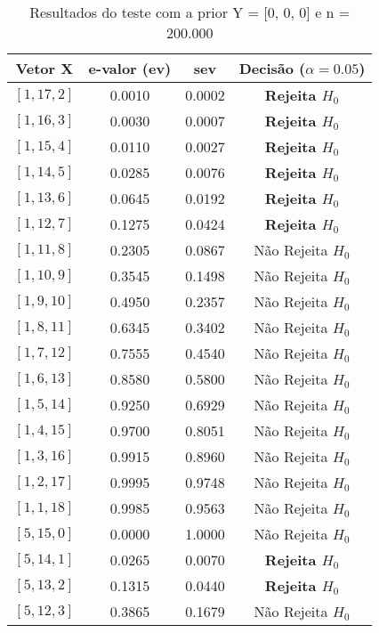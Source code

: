 \documentclass[12pt, a4paper]{article}
\begin{document}
\begin{table}[H]
    \centering
    \caption{Resultados do teste com a prior Y = [0, 0, 0] e n = 200.000}
    \label{tab:prior0}
    \begin{tabular}{cccc}
        \toprule
        \textbf{Vetor X} & \textbf{e-valor (ev)} & \textbf{sev} & \textbf{Decisão ($\alpha=0.05$)} \\
        \midrule
        {$[1, 17, 2]$} & 0.0010 & 0.0002 & \textbf{Rejeita $H_0$} \\
        {$[1, 16, 3]$} & 0.0030 & 0.0007 & \textbf{Rejeita $H_0$} \\
        {$[1, 15, 4]$} & 0.0110 & 0.0027 & \textbf{Rejeita $H_0$} \\
        {$[1, 14, 5]$} & 0.0285 & 0.0076 & \textbf{Rejeita $H_0$} \\
        {$[1, 13, 6]$} & 0.0645 & 0.0192 & \textbf{Rejeita $H_0$} \\
        {$[1, 12, 7]$} & 0.1275 & 0.0424 & \textbf{Rejeita $H_0$} \\
        {$[1, 11, 8]$} & 0.2305 & 0.0867 & Não Rejeita $H_0$ \\
        {$[1, 10, 9]$} & 0.3545 & 0.1498 & Não Rejeita $H_0$ \\
        {$[1, 9, 10]$} & 0.4950 & 0.2357 & Não Rejeita $H_0$ \\
        {$[1, 8, 11]$} & 0.6345 & 0.3402 & Não Rejeita $H_0$ \\
        {$[1, 7, 12]$} & 0.7555 & 0.4540 & Não Rejeita $H_0$ \\
        {$[1, 6, 13]$} & 0.8580 & 0.5800 & Não Rejeita $H_0$ \\
        {$[1, 5, 14]$} & 0.9250 & 0.6929 & Não Rejeita $H_0$ \\
        {$[1, 4, 15]$} & 0.9700 & 0.8051 & Não Rejeita $H_0$ \\
        {$[1, 3, 16]$} & 0.9915 & 0.8960 & Não Rejeita $H_0$ \\
        {$[1, 2, 17]$} & 0.9995 & 0.9748 & Não Rejeita $H_0$ \\
        {$[1, 1, 18]$} & 0.9985 & 0.9563 & Não Rejeita $H_0$ \\
        \midrule
        {$[5, 15, 0]$} & 0.0000 & 1.0000 & Não Rejeita $H_0$ \\
        {$[5, 14, 1]$} & 0.0265 & 0.0070 & \textbf{Rejeita $H_0$} \\
        {$[5, 13, 2]$} & 0.1315 & 0.0440 & \textbf{Rejeita $H_0$} \\
        {$[5, 12, 3]$} & 0.3865 & 0.1679 & Não Rejeita $H_0$ \\

\end{tabular}
\end{table}
\end{document}
